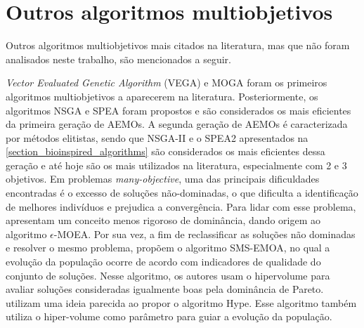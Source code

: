 \section{Outros algoritmos multiobjetivos}
Outros algoritmos multiobjetivos mais citados na literatura, mas que não foram analisados neste trabalho, são mencionados a seguir.

\textit{Vector Evaluated Genetic Algorithm} (VEGA) \cite{Schaffer1985} e \ac{MOGA} \cite{MOGA} foram os primeiros algoritmos multiobjetivos a aparecerem na literatura. Posteriormente, os algoritmos \ac{NSGA} \cite{Srinivas1994} e \ac{SPEA} \cite{Zitzler1999} foram propostos e são considerados os mais eficientes da primeira geração de \acp{AEMO}. A segunda geração de \acp{AEMO} é caracterizada por métodos elitistas, sendo que NSGA-II e o SPEA2 apresentados na \ref{section_bioinspired_algorithms} são considerados os mais eficientes dessa geração e até hoje são os mais utilizados na literatura, especialmente com 2 e 3 objetivos. Em problemas \textit{many-objective}, uma das principais dificuldades encontradas é o excesso de soluções não-dominadas, o que dificulta a identificação de melhores indivíduos e prejudica a convergência. Para lidar com esse problema,  apresentam um conceito menos rigoroso de dominância, dando origem ao algoritmo $\epsilon$-MOEA. Por sua vez, a fim de reclassificar as soluções não dominadas e resolver o mesmo problema,  propõem o algoritmo SMS-EMOA, no qual a evolução da população ocorre de acordo com indicadores de qualidade do conjunto de soluções. Nesse algoritmo, os autores usam o hipervolume para avaliar soluções consideradas igualmente boas pela dominância de Pareto.  utilizam uma ideia parecida ao propor o algoritmo Hype. Esse algoritmo também utiliza o hiper-volume como parâmetro para guiar a evolução da população. 


